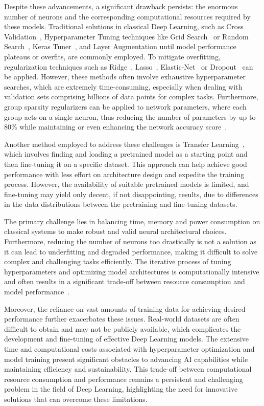 \documentclass[12pt,a4paper]{report}
\begin{document}
Despite these advancements, a significant drawback persists: the enormous number of neurons and the corresponding computational resources required by these models. Traditional solutions in classical Deep Learning, such as Cross Validation~\cite{berrar2019cross}, Hyperparameter Tuning techniques like Grid Search~\cite{liashchynskyi2019grid} or Random Search~\cite{liashchynskyi2019grid}, Keras Tuner~\cite{pon2021hyperparameter}, and Layer Augmentation until model performance plateaus or overfits, are commonly employed. To mitigate overfitting, regularization techniques such as Ridge~\cite{ogutu2012genomic}, Lasso~\cite{ogutu2012genomic}, Elastic-Net~\cite{ogutu2012genomic} or Dropout~\cite{srivastava2014dropout} can be applied. However, these methods often involve exhaustive hyperparameter searches, which are extremely time-consuming, especially when dealing with validation sets comprising billions of data points for complex tasks. Furthermore, group sparsity regularizers can be applied to network parameters, where each group acts on a single neuron, thus reducing the number of parameters by up to 80\% while maintaining or even enhancing the network accuracy score~\cite{alvarez2018learning}.

Another method employed to address these challenges is Transfer Learning~\cite{weiss2016survey}, which involves finding and loading a pretrained model as a starting point and then fine-tuning it on a specific dataset. This approach can help achieve good performance with less effort on architecture design and expedite the training process. However, the availability of suitable pretrained models is limited, and fine-tuning may yield only decent, if not disappointing, results, due to differences in the data distributions between the pretraining and fine-tuning datasets.

The primary challenge lies in balancing time, memory and power consumption on classical systems to make robust and valid neural architectural choices. Furthermore, reducing the number of neurons too drastically is not a solution as it can lead to underfitting and degraded performance, making it difficult to solve complex and challenging tasks efficiently. The iterative process of tuning hyperparameters and optimizing model architectures is computationally intensive and often results in a significant trade-off between resource consumption and model performance~\cite{liashchynskyi2019grid}.

Moreover, the reliance on vast amounts of training data for achieving desired performance further exacerbates these issues. Real-world datasets are often difficult to obtain and may not be publicly available, which complicates the development and fine-tuning of effective Deep Learning models. The extensive time and computational costs associated with hyperparameter optimization and model training present significant obstacles to advancing AI capabilities while maintaining efficiency and sustainability. This trade-off between computational resource consumption and performance remains a persistent and challenging problem in the field of Deep Learning, highlighting the need for innovative solutions that can overcome these limitations.
\end{document}
